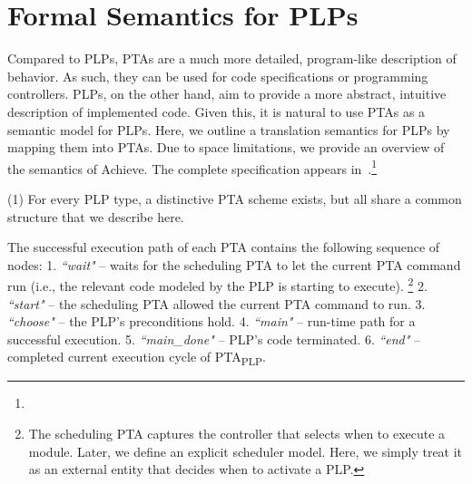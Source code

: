\documentclass[letterpaper]{article}
\begin{document}
\section{Formal Semantics for PLPs}
Compared to PLPs, PTAs are a much more detailed, program-like description of behavior.
As such, they can be used for code specifications or programming controllers. PLPs, on the other hand,
aim to provide a more abstract, intuitive description of implemented code.
Given this, it is natural to use PTAs as a semantic model for PLPs. Here, we outline a translation
semantics for PLPs by mapping them into PTAs. 
Due to space limitations, we provide an overview of the
semantics of Achieve. The complete specification appears in~\citet{kovalchu2018}.\footnote{} 



(1) For every PLP type, a distinctive PTA scheme exists, but all 
share a common structure that we describe here.
\par The successful execution path of each PTA contains the following sequence of nodes: 1. \textit{``wait"} -- waits for the scheduling PTA to let the current PTA command run (i.e., the relevant code modeled by the PLP is starting to execute).%
\footnote{The scheduling PTA captures the controller that selects when to execute a module. Later, we define an explicit scheduler model.
Here, we simply treat it as an external entity that decides when to activate a PLP.}
2. \textit{``start"} -- the scheduling PTA allowed the current PTA command to run. 3. \textit{``choose"} -- the PLP's preconditions hold. 4. \textit{``main"} -- run-time path for a successful execution. 5. \textit{``main\_done"} -- PLP's code terminated. 6. \textit{``end"} -- completed current execution cycle of PTA\textsubscript{PLP}. 
\end{document}
